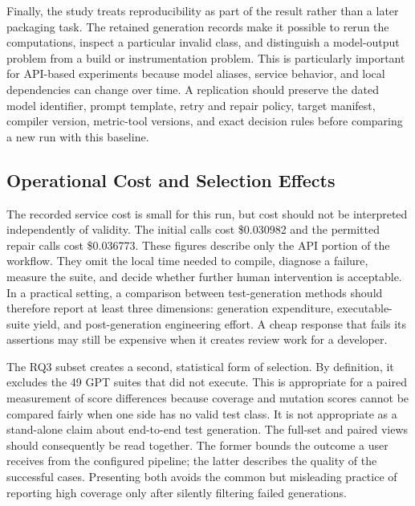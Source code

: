 Finally, the study treats reproducibility as part of the result rather than a later packaging task. The retained generation records make it possible to rerun the computations, inspect a particular invalid class, and distinguish a model-output problem from a build or instrumentation problem. This is particularly important for API-based experiments because model aliases, service behavior, and local dependencies can change over time. A replication should preserve the dated model identifier, prompt template, retry and repair policy, target manifest, compiler version, metric-tool versions, and exact decision rules before comparing a new run with this baseline.

\balance
\subsection{Operational Cost and Selection Effects}
The recorded service cost is small for this run, but cost should not be interpreted independently of validity. The initial calls cost \$0.030982 and the permitted repair calls cost \$0.036773. These figures describe only the API portion of the workflow. They omit the local time needed to compile, diagnose a failure, measure the suite, and decide whether further human intervention is acceptable. In a practical setting, a comparison between test-generation methods should therefore report at least three dimensions: generation expenditure, executable-suite yield, and post-generation engineering effort. A cheap response that fails its assertions may still be expensive when it creates review work for a developer.

The RQ3 subset creates a second, statistical form of selection. By definition, it excludes the 49 GPT suites that did not execute. This is appropriate for a paired measurement of score differences because coverage and mutation scores cannot be compared fairly when one side has no valid test class. It is not appropriate as a stand-alone claim about end-to-end test generation. The full-set and paired views should consequently be read together. The former bounds the outcome a user receives from the configured pipeline; the latter describes the quality of the successful cases. Presenting both avoids the common but misleading practice of reporting high coverage only after silently filtering failed generations.

